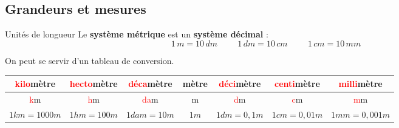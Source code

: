 
\begin{pageCours} %


\section{Grandeurs et mesures}

\begin{DefT}{Unités de longueur}
Le \textbf{système métrique} est un \textbf{système décimal} :\\
\[1\, m=10\, dm \hspace{1cm} 1\, dm=10\, cm \hspace{1cm}1\, cm=10\, mm\]
\end{DefT}

\begin{Mt}
On peut se servir d'un tableau de conversion.
\begin{center}
\begin{tabular}{c|c|c|c|c|c|c}
    \textcolor{red}{kilo}mètre & \textcolor{red}{hecto}mètre & \textcolor{red}{déca}mètre & mètre & \textcolor{red}{déci}mètre & \textcolor{red}{centi}mètre & \textcolor{red}{milli}mètre  \\ \hline 
    \textcolor{red}{k}m & \textcolor{red}{h}m & \textcolor{red}{da}m & m & \textcolor{red}{d}m & \textcolor{red}{c}m & \textcolor{red}{m}m \\ \hline
    \(1 km = 1 000 m\) & \(1 hm = 100 m\) & \(1 dam = 10 m\) & \(1 m\) & \(1 dm = 0,1 m\) & \(1 cm = 0,01 m\) & \(1 mm = 0,001 m\)
\end{tabular}
\end{center}
\end{Mt}



\end{pageCours}
